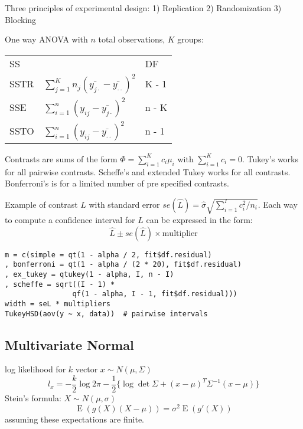 \documentclass[10pt, twocolumn]{article}
\newcommand{\Expect}{\operatorname{E}}
\begin{document}
Three principles of experimental design: 1) Replication 2) Randomization 3)
Blocking

One way ANOVA with $n$ total observations, $K$ groups:

{
\centering
\begin{tabular}{lll}
    SS   &  & DF     \\
    SSTR & $\sum_{j=1}^K n_j (\bar{y_{j \cdot}} - \bar{y_{\cdot \cdot}})^2$  & K - 1 \\
    SSE  & $\sum_{i=1}^n (y_{ij} - \bar{y_{j \cdot}})^2$  & n - K \\
    SSTO & $\sum_{i=1}^n (y_{ij} - \bar{y_{\cdot \cdot}})^2$  & n - 1 
\end{tabular}
}

Contrasts are sums of the form $\Phi = \sum_{i=1}^K c_i \mu_i$ with
$\sum_{i=1}^K c_i = 0$.
Tukey's works for all pairwise contrasts.
Scheffe's and extended Tukey works for all contrasts.
Bonferroni's is for a limited number of pre specified contrasts.

Example of contrast $L$ with standard error $se(\hat{L}) = \hat{\sigma}
\sqrt{\sum_{i=1}^I c_i^2 / n_i}$.
Each way to compute a confidence interval for $L$ can be expressed in the form:
$$
    \hat{L} \pm se(\hat{L}) \times \text{multiplier}
$$

\begin{verbatim}
m = c(simple = qt(1 - alpha / 2, fit$df.residual)
, bonferroni = qt(1 - alpha / (2 * 20), fit$df.residual)
, ex_tukey = qtukey(1 - alpha, I, n - I)
, scheffe = sqrt((I - 1) *
                qf(1 - alpha, I - 1, fit$df.residual)))
width = seL * multipliers
TukeyHSD(aov(y ~ x, data))  # pairwise intervals
\end{verbatim}

\newpage

\subsection*{Multivariate Normal}

log likelihood for $k$ vector $x \sim N(\mu, \Sigma)$
\[
    l_x = -\frac{k}{2} \log 2 \pi - \frac{1}{2}
    \{ \log \det \Sigma + (x - \mu)^T \Sigma^{-1} (x - \mu) \}
\]
Stein's formula: $X \sim N(\mu, \sigma)$
\[
    \Expect (g(X) (X - \mu)) = \sigma^2 \Expect(g'(X))
\]
assuming these expectations are finite.
\end{document}
